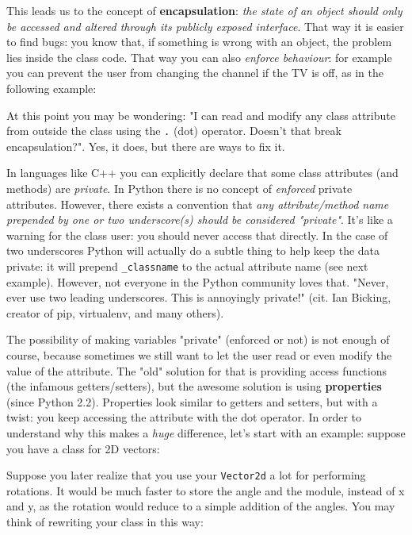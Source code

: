 This leads us to the concept of \textbf{encapsulation}: \textit{the state of an object should only be accessed and altered through its publicly exposed interface}. That way it is easier to find bugs: you know that, if something is wrong with an object, the problem lies inside the class code. That way you can also \textit{enforce behaviour}: for example you can prevent the user from changing the channel if the TV is off, as in the following example:



At this point you may be wondering: "I can read and modify any class attribute from outside the class using the \texttt{.} (dot) operator. Doesn't that break encapsulation?". Yes, it does, but there are ways to fix it.

In languages like C++ you can explicitly declare that some class attributes (and methods) are \textit{private}. In Python there is no concept of \textit{enforced} private attributes. However, there exists a convention that \textit{any attribute/method name prepended by one or two underscore(s) should be considered "private"}. It's like a warning for the class user: you should never access that directly. In the case of two underscores Python will actually do a subtle thing to help keep the data private: it will prepend \texttt{\_classname} to the actual attribute name (see next example). However, not everyone in the Python community loves that. "Never, ever use two leading underscores. This is annoyingly private!" (cit. Ian Bicking, creator of pip, virtualenv, and many others).



The possibility of making variables "private" (enforced or not) is not enough of course, because sometimes we still want to let the user read or even modify the value of the attribute. The "old" solution for that is providing access functions (the infamous getters/setters), but the awesome solution is using \textbf{properties} (since Python 2.2). Properties look similar to getters and setters, but with a twist: you keep accessing the attribute with the dot operator. In order to understand why this makes a \textit{huge} difference, let's start with an example: suppose you have a class for 2D vectors:



Suppose you later realize that you use your \texttt{Vector2d} a lot for performing rotations. It would be much faster to store the angle and the module, instead of x and y, as the rotation would reduce to a simple addition of the angles. You may think of rewriting your class in this way:

